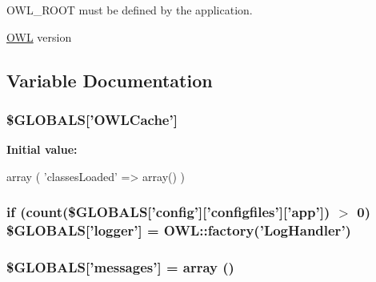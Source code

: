 OWL\_\-ROOT must be defined by the application. 

\hyperlink{classOWL}{OWL} version 

\subsection{Variable Documentation}
\subsubsection[{\$GLOBALS}]{\setlength{\rightskip}{0pt plus 5cm}\$GLOBALS\mbox{[}'OWLCache'\mbox{]}}\label{OWLloader_8php_a79190ec221c2b52403f7324f1d224c8f}
{\bfseries Initial value:}
\begin{DoxyCode}
 array (
         'classesLoaded' => array()
)
\end{DoxyCode}
\subsubsection[{\$GLOBALS}]{\setlength{\rightskip}{0pt plus 5cm}if (count(\$GLOBALS\mbox{[}'config'\mbox{]}\mbox{[}'configfiles'\mbox{]}\mbox{[}'app'\mbox{]}) $>$ 0) \$GLOBALS\mbox{[}'logger'\mbox{]} = OWL::factory('{\bf LogHandler}')}\label{OWLloader_8php_a5657c6427a5b1e3d4450f366cddef80a}
\subsubsection[{\$GLOBALS}]{\setlength{\rightskip}{0pt plus 5cm}\$GLOBALS\mbox{[}'messages'\mbox{]} = array ()}\label{OWLloader_8php_a65f2996116eed36e9ab25f254a470259}
